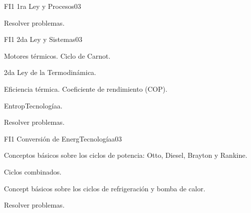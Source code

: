 \begin{syllabus}
\begin{unit}{FI1 1ra Ley y Procesos}{}{0}{3}
   \begin{learningoutcomes}
      \item Resolver problemas.
   \end{learningoutcomes}
\end{unit}

\begin{unit}{FI1 2da Ley y Sistemas}{}{0}{3}
\begin{topics}
      \item Motores térmicos. Ciclo de Carnot.
      \item 2da Ley de la Termodinámica.
      \item Eficiencia térmica. Coeficiente de rendimiento (COP).
      \item EntropTecnologíaa.
      
%       
   \end{topics}

   \begin{learningoutcomes}
      \item Resolver problemas.
   \end{learningoutcomes}
\end{unit}

\begin{unit}{FI1 Conversión de EnergTecnologíaa}{}{0}{3}
\begin{topics}
      \item Conceptos básicos sobre los ciclos de potencia: Otto, Diesel, Brayton y Rankine.
      \item Ciclos combinados.
      \item Concept básicos sobre los ciclos de refrigeración y bomba de calor.
     
     
   \end{topics}

   \begin{learningoutcomes}
      \item Resolver problemas.
   \end{learningoutcomes}
\end{unit}



\begin{coursebibliography}
\end{coursebibliography}

\end{syllabus}
